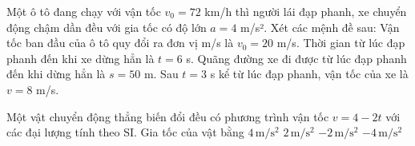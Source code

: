 \begin{ex}
Một ô tô đang chạy với vận tốc $v_0 = 72$ km/h thì người lái đạp phanh, xe chuyển động chậm dần đều với gia tốc có độ lớn $a = 4$ m/s². Xét các mệnh đề sau:
\choiceTF
{\True Vận tốc ban đầu của ô tô quy đổi ra đơn vị m/s là $v_0 = 20$ m/s.}
{Thời gian từ lúc đạp phanh đến khi xe dừng hẳn là $t = 6$ s.}
{\True Quãng đường xe đi được từ lúc đạp phanh đến khi dừng hẳn là $s = 50$ m.}
{Sau $t = 3$ s kể từ lúc đạp phanh, vận tốc của xe là $v = 8$ m/s.}
\end{ex}

\begin{ex}
Một vật chuyển động thẳng biến đổi đều có phương trình vận tốc $v=4-2t$ với các đại lượng tính theo SI. Gia tốc của vật bằng
\choice
{$4\,\mathrm{m/s^2}$}
{$2\,\mathrm{m/s^2}$}
{\True $-2\,\mathrm{m/s^2}$}
{$-4\,\mathrm{m/s^2}$}
\end{ex}

